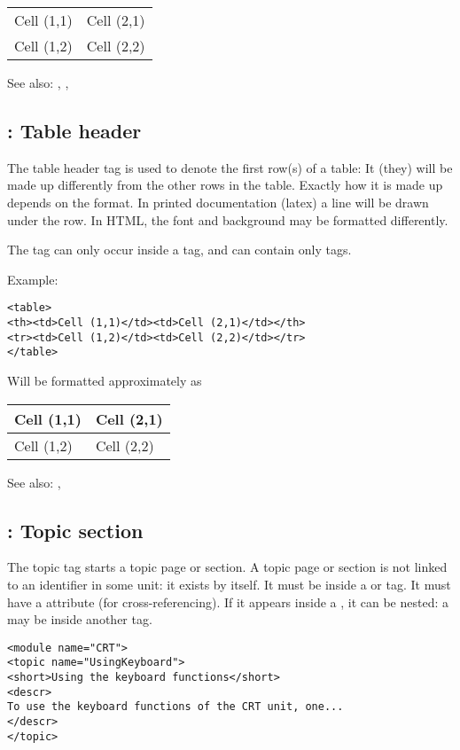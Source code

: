 \begin{tabular}{ll}
Cell (1,1) & Cell (2,1) \\
Cell (1,2) & Cell (2,2)
\end{tabular}

See also: , , 

\subsection{ : Table header}
\label{tag:th}
The  table header tag is used to denote the first row(s) of a table: 
It (they) will be made up differently from the other rows in the table.
Exactly how it is made up depends on the format. In printed documentation
(latex) a line will be drawn under the row. In HTML, the font and background
may be formatted differently.

The  tag can only occur inside a  tag, and can contain
only  tags.

Example:
\begin{verbatim}
<table>
<th><td>Cell (1,1)</td><td>Cell (2,1)</td></th>
<tr><td>Cell (1,2)</td><td>Cell (2,2)</td></tr>
</table>
\end{verbatim}
Will be formatted approximately as

\begin{tabular}{ll}
Cell (1,1) & Cell (2,1) \\ \hline
Cell (1,2) & Cell (2,2)
\end{tabular}
 
See also: , 

\subsection{ : Topic section}
\label{tag:topic}
The topic tag starts a topic page or section. A topic page or section is
not linked to an identifier in some unit: it exists by itself. It must be 
inside a  or  tag. It must have a 
attribute (for cross-referencing). If it appears inside a , 
it can be nested: a  may be inside another  tag.

\begin{verbatim}
<module name="CRT">
<topic name="UsingKeyboard">
<short>Using the keyboard functions</short>
<descr>
To use the keyboard functions of the CRT unit, one...
</descr>
</topic>
\end{verbatim}

